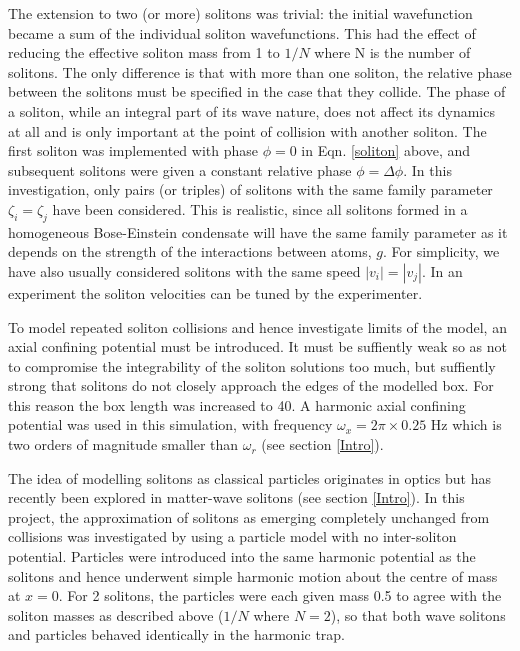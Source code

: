 \documentclass[10pt, twocolumn]{revtex4}    %
\begin{document}
The extension to two (or more) solitons was trivial: the initial wavefunction became a sum of the individual soliton wavefunctions. This had the effect of reducing the effective soliton mass from 1 to $1/N$ where N is the number of solitons. The only difference is that with more than one soliton, the relative phase between the solitons must be specified in the case that they collide. The phase of a soliton, while an integral part of its wave nature, does not affect its dynamics at all and is only important at the point of collision with another soliton. The first soliton was implemented with phase $\phi = 0$ in Eqn. \ref{soliton} above, and subsequent solitons were given a constant relative phase $\phi=\Delta \phi$. In this investigation, only pairs (or triples) of solitons with the same family parameter $\zeta_i=\zeta_j$ have been considered. This is realistic, since all solitons formed in a homogeneous Bose-Einstein condensate will have the same family parameter as it depends on the strength of the interactions between atoms, $g$. For simplicity, we have also usually considered solitons with the same speed $|v_i| = |v_j|$. In an experiment the soliton velocities can be tuned by the experimenter. 

To model repeated soliton collisions and hence investigate limits of the model, an axial confining potential must be introduced. It must be suffiently weak so as not to compromise the integrability of the soliton solutions too much, but suffiently strong that solitons do not closely approach the edges of the modelled box. For this reason the box length was increased to 40. A harmonic axial confining potential was used in this simulation, with frequency  $\omega_x = 2\pi \times 0.25$ Hz which is two orders of magnitude smaller than $\omega_r$ (see section \ref{Intro}). 

The idea of modelling solitons as classical particles originates in optics but has recently been explored in matter-wave solitons (see section \ref{Intro}). In this project, the approximation of solitons as emerging completely unchanged from collisions was investigated by using a particle model with no inter-soliton potential. Particles were introduced into the same harmonic potential as the solitons and hence underwent simple harmonic motion about the centre of mass at $x=0$. For 2 solitons, the particles were each given mass 0.5 to agree with the soliton masses as described above ($1/N$ where $N=2$), so that both wave solitons and particles behaved identically in the harmonic trap. 
\end{document}
